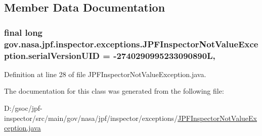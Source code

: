 \subsection{Member Data Documentation}
\subsubsection[{\texorpdfstring{serial\+Version\+U\+ID}{serialVersionUID}}]{\setlength{\rightskip}{0pt plus 5cm}final long gov.\+nasa.\+jpf.\+inspector.\+exceptions.\+J\+P\+F\+Inspector\+Not\+Value\+Exception.\+serial\+Version\+U\+ID = -\/2740290995233090890L\hspace{0.3cm}{\ttfamily [static]}, {\ttfamily [private]}}\hypertarget{classgov_1_1nasa_1_1jpf_1_1inspector_1_1exceptions_1_1_j_p_f_inspector_not_value_exception_a788c71d416499efebb0ce116d9a59f03}{}\label{classgov_1_1nasa_1_1jpf_1_1inspector_1_1exceptions_1_1_j_p_f_inspector_not_value_exception_a788c71d416499efebb0ce116d9a59f03}


Definition at line 28 of file J\+P\+F\+Inspector\+Not\+Value\+Exception.\+java.



The documentation for this class was generated from the following file\+:\begin{DoxyCompactItemize}
\item 
D\+:/gsoc/jpf-\/inspector/src/main/gov/nasa/jpf/inspector/exceptions/\hyperlink{_j_p_f_inspector_not_value_exception_8java}{J\+P\+F\+Inspector\+Not\+Value\+Exception.\+java}\end{DoxyCompactItemize}
